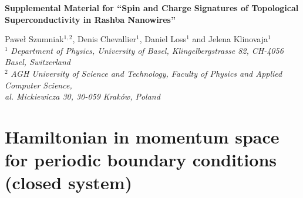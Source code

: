 \documentclass[prl,twocolumn,showpacs,floatfix,amsbsy,amsbsy,superscriptaddress]{revtex4-1}
\begin{document}
\newpage

\onecolumngrid


\bigskip 

\begin{center}
\large{\bf Supplemental Material for ``Spin and Charge Signatures of Topological Superconductivity in Rashba Nanowires'' \\}
\end{center}
\begin{center}
Pawe\l{} Szumniak$^{1,2}$, Denis Chevallier$^{1}$, Daniel Loss$^{1}$ and Jelena Klinovaja$^{1}$\\
$^{1}$ {\it Department of Physics, University of Basel, Klingelbergstrasse 82, CH-4056 Basel, Switzerland}\\
$^{2}$ {\it AGH University of Science and Technology, Faculty of
Physics and Applied Computer Science,\\
al. Mickiewicza 30, 30-059 Krak\'ow, Poland}
\end{center}

\section{Hamiltonian in momentum space for periodic boundary conditions (closed system)}\label{sup_analytic}
\end{document}
